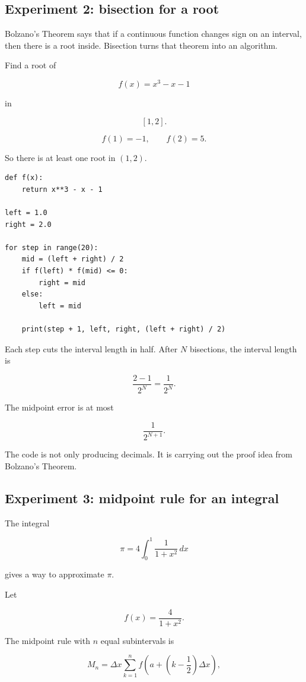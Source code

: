\subsection{Experiment 2: bisection for a root}
\label{appsubsec:python-bisection}

Bolzano's Theorem says that if a continuous function changes sign on an interval, then
there is a root inside.  Bisection turns that theorem into an algorithm.

Find a root of

\[
f(x)=x^3-x-1
\]

in

\[
[1,2].
\]

\[
f(1)=-1,
\qquad
f(2)=5.
\]

So there is at least one root in \((1,2)\).

\begin{verbatim}
def f(x):
    return x**3 - x - 1

left = 1.0
right = 2.0

for step in range(20):
    mid = (left + right) / 2
    if f(left) * f(mid) <= 0:
        right = mid
    else:
        left = mid

    print(step + 1, left, right, (left + right) / 2)
\end{verbatim}

Each step cuts the interval length in half.  After \(N\) bisections, the interval length is

\[
\frac{2-1}{2^N}=\frac1{2^N}.
\]

The midpoint error is at most

\[
\frac1{2^{N+1}}.
\]

The code is not only producing decimals.  It is carrying out the proof idea from
Bolzano's Theorem.

\subsection{Experiment 3: midpoint rule for an integral}
\label{appsubsec:python-midpoint-rule}

The integral

\[
\pi=4\int_0^1 \frac{1}{1+x^2}\,dx
\]

gives a way to approximate \(\pi\).

Let

\[
f(x)=\frac{4}{1+x^2}.
\]

The midpoint rule with \(n\) equal subintervals is

\[
M_n=\Delta x\sum_{k=1}^n f\left(a+\left(k-\frac12\right)\Delta x\right),
\]

